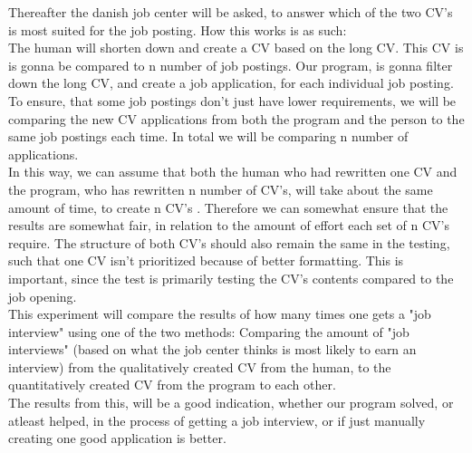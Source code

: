 Thereafter the danish job center will be asked, to answer which of the two CV's is most suited
for the job posting. How this works is as such:
\\
The human will shorten down and create a CV based on the long CV. This CV is
is gonna be compared to n number of job postings.
Our program, is gonna filter down the long CV, and create a job application,
for each individual job posting. 
To ensure, that some job postings don't just have lower requirements, we will be
comparing the new CV applications from both the program and the person to the same 
job postings each time. In total we will be comparing n number of applications.
\\
In this way, we can assume that both the human who had rewritten one
CV and the program, who has rewritten n number of CV's,
will take about the same amount of time, to create n CV's .
Therefore we can somewhat ensure that the results are somewhat fair, in relation to the amount of effort each set of n CV's require.
The structure of both CV's should also remain the same in the testing, such that one CV isn't prioritized because of better formatting.
This is important, since the test is primarily testing the CV's contents compared to the job opening.
\\
This experiment will compare the results of how many times one gets a "job
interview" using one of the two methods: Comparing the amount of 
"job interviews" (based on what the job center thinks is most likely to earn an interview) 
from the qualitatively created CV from
the human, to the quantitatively created CV from the program to
each other.
\\
The results from this, will be a good indication, whether our program solved, or
atleast helped, in the process of getting a job interview, or if just manually
creating one good application is better.
